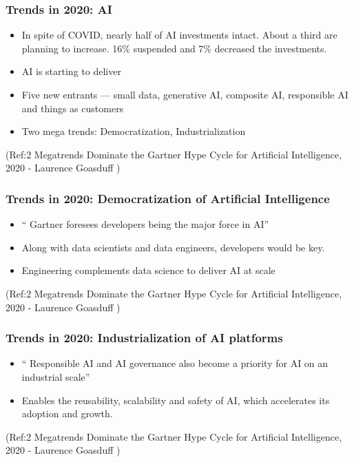 \begin{frame}[fragile]\frametitle{Trends in 2020: AI}

\begin{itemize}
\item In spite of COVID, nearly half of AI investments intact. About a third are planning to increase. 16\% suspended and 7\% decreased the investments.
\item AI is starting to deliver
\item Five new entrants — small data, generative AI, composite AI, responsible AI and things as customers
\item Two mega trends: Democratization, Industrialization
\end{itemize}


{\tiny (Ref:2 Megatrends Dominate the Gartner Hype Cycle for Artificial Intelligence, 2020 - Laurence Goasduff )}

\end{frame}

\begin{frame}[fragile]\frametitle{Trends in 2020: Democratization of Artificial Intelligence}

\begin{itemize}
\item `` Gartner foresees developers being the major force in AI''
\item Along with data scientists and data engineers, developers would be key.
\item Engineering complements data science to deliver AI at scale
\end{itemize}


{\tiny (Ref:2 Megatrends Dominate the Gartner Hype Cycle for Artificial Intelligence, 2020 - Laurence Goasduff )}

\end{frame}

\begin{frame}[fragile]\frametitle{Trends in 2020: Industrialization of AI platforms
}

\begin{itemize}
\item `` Responsible AI and AI governance also become a priority for AI on an industrial scale''
\item Enables the reusability, scalability and safety of AI, which accelerates its adoption and growth.
\end{itemize}


{\tiny (Ref:2 Megatrends Dominate the Gartner Hype Cycle for Artificial Intelligence, 2020 - Laurence Goasduff )}

\end{frame}

